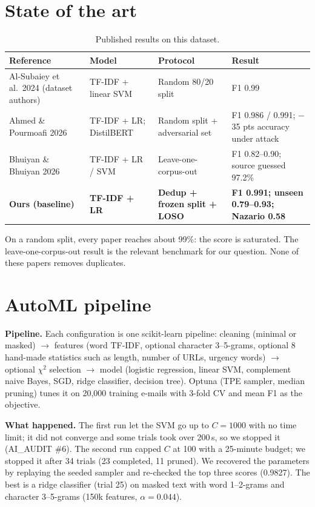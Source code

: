 \documentclass[11pt,a4paper]{article}
\begin{document}
\section{State of the art}
\begin{table}[H]\centering\small
\caption{Published results on this dataset.}
\begin{tabular}{L{3.5cm}L{3.2cm}L{3.5cm}L{4.4cm}}
\toprule
Reference & Model & Protocol & Result \\
\midrule
Al-Subaiey et al.\ 2024 (dataset authors) & TF-IDF + linear SVM & Random 80/20 split & F1 0.99 \\
Ahmed \& Pourmoafi 2026 & TF-IDF + LR; DistilBERT & Random split + adversarial set & F1 0.986 / 0.991; $-$35 pts accuracy under attack \\
Bhuiyan \& Bhuiyan 2026 & TF-IDF + LR / SVM & Leave-one-corpus-out & F1 0.82--0.90; source guessed 97.2\% \\
\midrule
\textbf{Ours (baseline)} & \textbf{TF-IDF + LR} & \textbf{Dedup + frozen split + LOSO} & \textbf{F1 0.991; unseen 0.79--0.93; Nazario 0.58} \\
\bottomrule
\end{tabular}
\end{table}
On a random split, every paper reaches about 99\%: the score is saturated. The leave-one-corpus-out result is the relevant benchmark for our question. None of these papers removes duplicates.

\section{AutoML pipeline}
\textbf{Pipeline.} Each configuration is one scikit-learn pipeline: cleaning (minimal or masked) $\rightarrow$ features (word TF-IDF, optional character 3--5-grams, optional 8 hand-made statistics such as length, number of URLs, urgency words) $\rightarrow$ optional $\chi^2$ selection $\rightarrow$ model (logistic regression, linear SVM, complement naive Bayes, SGD, ridge classifier, decision tree). Optuna (TPE sampler, median pruning) tunes it on 20,000 training e-mails with 3-fold CV and mean F1 as the objective.

\textbf{What happened.} The first run let the SVM go up to $C = 1000$ with no time limit; it did not converge and some trials took over 200\,s, so we stopped it (AI\_AUDIT \#6). The second run capped $C$ at 100 with a 25-minute budget; we stopped it after 34 trials (23 completed, 11 pruned). We recovered the parameters by replaying the seeded sampler and re-checked the top three scores (0.9827). The best is a ridge classifier (trial 25) on masked text with word 1--2-grams and character 3--5-grams (150k features, $\alpha = 0.044$).
\end{document}
